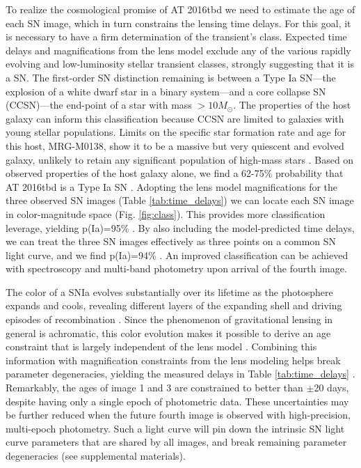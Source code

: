 \documentclass[12pt]{article}
\def\SNABC{AT 2016tbd\xspace}
\begin{document}
To realize the cosmological promise of \SNABC 
we need to estimate the age of each SN image, which in turn constrains the lensing time delays. For this
goal, it is necessary to have a firm determination of the transient’s class. Expected time delays and magnifications from the lens model exclude any of the various rapidly evolving and low-luminosity stellar transient classes, strongly suggesting that it is a SN. The first-order SN distinction remaining is between a Type Ia SN---the explosion of a white dwarf star in a binary system---and a core collapse SN (CCSN)---the end-point of a star with mass $>10 M_{\odot}$. 
The properties of the host galaxy can inform this classification because CCSN are limited to galaxies with young stellar populations. Limits on the specific star formation rate and age for this host, MRG-M0138, show it to be a massive but very quiescent and evolved galaxy, %
unlikely to retain any significant population of high-mass stars \cite{newman_resolving_2018}. Based on observed properties of the host galaxy alone, we find a 62-75\% probability that \SNABC is a Type Ia SN \cite{materials_methods_2020}. Adopting the lens model magnifications for the three observed SN images (Table \ref{tab:time_delays}) we can locate each SN image in color-magnitude space (Fig. \ref{fig:class}). This provides more classification leverage, yielding p(Ia)=95\% \cite{materials_methods_2020}. By also including the model-predicted time delays, we can treat the three SN images effectively as three points on a common SN light curve, and we find p(Ia)=94\% \cite{materials_methods_2020}.
An improved classification can be achieved with spectroscopy and multi-band photometry upon arrival of the fourth image.

The color of a SNIa evolves substantially over its lifetime as the photosphere expands and cools, revealing different layers of the expanding shell and driving episodes of recombination \cite{woosley_type_2007,kasen_type_2009}. Since the phenomenon of gravitational lensing in general is achromatic, this color evolution makes it possible to derive an age constraint that is largely independent of the lens model \cite{materials_methods_2020}.  Combining this information with magnification constraints from the lens modeling helps break parameter degeneracies, yielding the measured delays in Table \ref{tab:time_delays} \cite{materials_methods_2020}. 
Remarkably, the ages of image 1 and 3 are constrained to better than $\pm$20 days, despite having only a single epoch of photometric data.    These uncertainties may be 
further reduced when the future fourth image is observed with high-precision, multi-epoch photometry.  Such a light curve will pin down the intrinsic SN light curve parameters that are shared by all images, and break remaining parameter degeneracies (see supplemental materials).
\end{document}
